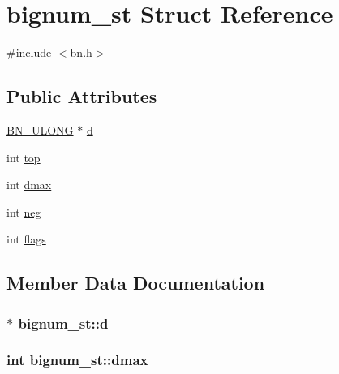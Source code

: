 \hypertarget{structbignum__st}{}\section{bignum\+\_\+st Struct Reference}
\label{structbignum__st}


{\ttfamily \#include $<$bn.\+h$>$}

\subsection*{Public Attributes}
\begin{DoxyCompactItemize}
\item 
\hyperlink{bn_8h_a59d6cc22b9b74e72363092a494a04165}{B\+N\+\_\+\+U\+L\+O\+NG} $\ast$ \hyperlink{structbignum__st_afa4e4a2eb24f9c3df7eb33fd589cba31}{d}
\item 
int \hyperlink{structbignum__st_acb2587e7e0ff144adee978acd5b362f6}{top}
\item 
int \hyperlink{structbignum__st_adc321f2d3b6d3962fda140080275267c}{dmax}
\item 
int \hyperlink{structbignum__st_a4bffe6c6b7a0f7fa9821b0339b7d126f}{neg}
\item 
int \hyperlink{structbignum__st_a7ab1fc90f994e4428dbf1f354cbc82b4}{flags}
\end{DoxyCompactItemize}


\subsection{Member Data Documentation}
\subsubsection[{\texorpdfstring{d}{d}}]{$\ast$ bignum\+\_\+st\+::d}\hypertarget{structbignum__st_afa4e4a2eb24f9c3df7eb33fd589cba31}{}\label{structbignum__st_afa4e4a2eb24f9c3df7eb33fd589cba31}
\subsubsection[{\texorpdfstring{dmax}{dmax}}]{\setlength{\rightskip}{0pt plus 5cm}int bignum\+\_\+st\+::dmax}\hypertarget{structbignum__st_adc321f2d3b6d3962fda140080275267c}{}\label{structbignum__st_adc321f2d3b6d3962fda140080275267c}
